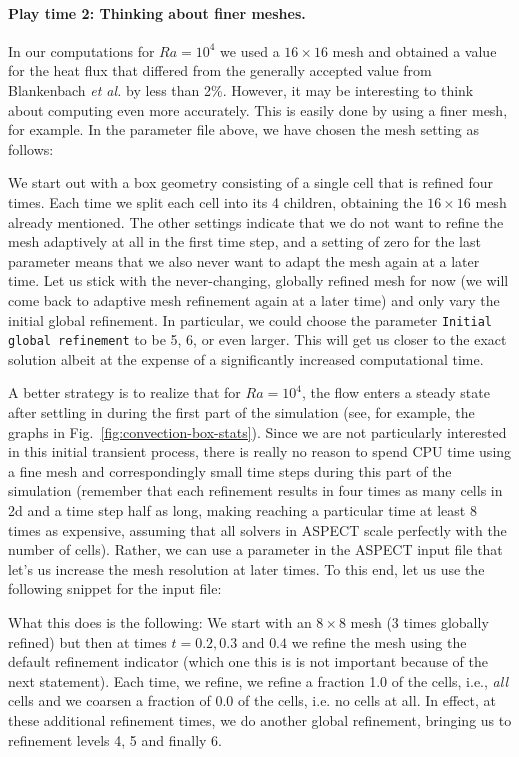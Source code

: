 \documentclass{article}
\newcommand{\aspect}{\textsc{ASPECT}}
\begin{document}
\paragraph{Play time 2: Thinking about finer meshes.}
In our computations for $Ra=10^4$ we used a $16\times 16$ mesh and obtained a
value for the heat flux that differed from the generally accepted value from
Blankenbach \textit{et al.} \cite{BBC89} by less than 2\%. However, it may be
interesting to think about computing even more accurately. This is easily done
by using a finer mesh, for example. In the parameter file above, we have chosen
the mesh setting as follows:
%

%
We start out with a box geometry consisting of a single cell that is refined
four times. Each time we split each cell into its 4 children, obtaining the
$16\times 16$ mesh already mentioned. The other settings indicate that we do not
want to refine the mesh adaptively at all in the first time step, and a setting
of zero for the last parameter means that we also never want to adapt the mesh
again at a later time. Let us stick with the never-changing, globally refined
mesh for now (we will come back to adaptive mesh refinement again at a later
time) and only vary the initial global refinement. In particular, we could
choose the parameter \texttt{Initial global refinement} to be 5, 6, or even
larger. This will get us closer to the exact solution albeit at the expense of a
significantly increased computational time.

A better strategy is to realize that for $Ra=10^4$, the flow enters a steady
state after settling in during the first part of the simulation (see, for
example, the graphs in Fig.~\ref{fig:convection-box-stats}). Since we are not
particularly interested in this initial transient process, there is really no
reason to spend CPU time using a fine mesh and correspondingly small time
steps during this part of the simulation (remember that each refinement results
in four times as many cells in 2d and a time step half as long, making reaching
a particular time at least 8 times as expensive, assuming that all solvers in
\aspect{} scale perfectly with the number of cells). Rather, we can use a
parameter in the \aspect{} input file that let's us increase the mesh resolution
at later times. To this end, let us use the following snippet for the input
file:


What this does is the following: We start with an $8\times 8$ mesh (3 times
globally refined) but then at times $t=0.2,0.3$ and $0.4$ we refine the mesh
using the default refinement indicator (which one this is is not important
because of the next statement). Each time, we refine, we refine a fraction 1.0
of the cells, i.e., \textit{all} cells and we coarsen a fraction of 0.0 of the
cells, i.e. no cells at all. In effect, at these additional refinement times, we
do another global refinement, bringing us to refinement levels 4, 5 and finally
6.
\end{document}
